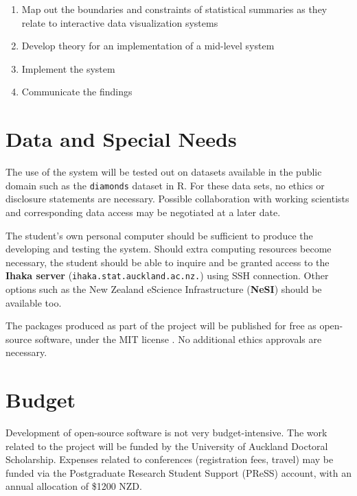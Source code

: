 \documentclass[12pt,a4paper]{article}
\begin{document}
\begin{enumerate}

\item Map out the boundaries and constraints of statistical summaries as they relate to interactive data visualization systems 
\item Develop theory for an implementation of a mid-level system
\item Implement the system
\item Communicate the findings

\end{enumerate}


\section{Data and Special Needs}
\label{sec:data}

The use of the system will be tested out on datasets available in the public domain such as the \texttt{diamonds} dataset in R. For these data sets, no ethics or disclosure statements are necessary. Possible collaboration with working scientists and corresponding data access may be negotiated at a later date.  

The student's own personal computer should be sufficient to produce the developing and testing the system. Should extra computing resources become necessary, the student should be able to inquire and be granted access to the \textbf{Ihaka server} (\texttt{ihaka.stat.auckland.ac.nz.}) using SSH connection. Other options such as the New Zealand eScience Infrastructure (\textbf{NeSI}) should be available too. 

The packages produced as part of the project will be published for free as open-source software, under the MIT license \citep{mit2023}. No additional ethics approvals are necessary. 

\section{Budget}

Development of open-source software is not very budget-intensive. The work related to the project will be funded by the University of Auckland Doctoral Scholarship. Expenses related to conferences (registration fees, travel) may be funded via the Postgraduate Research Student Support (PReSS) account, with an annual allocation of \$1200 NZD. 
\end{document}
